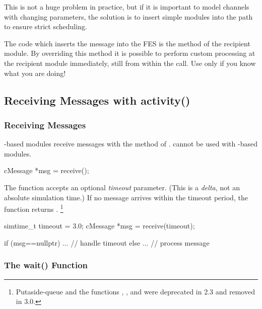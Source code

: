 \begin{ned}
\begin{note}
   This is not a huge problem in practice, but if it is important to model
   channels with changing parameters, the solution is to insert simple modules
   into the path to ensure strict scheduling.
\end{note}

The code which inserts the message into the FES is the 
method of the recipient module. By overriding this method it is possible
to perform custom processing at the recipient module immediately, still
from within the  call. Use only if you know what you are doing!


\subsection{Receiving Messages with activity()}
\label{sec:simple-modules:receiving-with-activity}

\subsubsection{Receiving Messages}
\label{sec:simple-modules:receive}

-based modules receive messages with the 
method of .  cannot be used with
-based modules.

\begin{cpp}
cMessage *msg = receive();
\end{cpp}

The  function accepts an optional \textit{timeout}
parameter. (This is a \textit{delta}, not an
absolute simulation time.) If no message arrives within the timeout
period, the function returns .
    \footnote{Putaside-queue and the functions ,
    , and  were deprecated
    in {\opp} 2.3 and removed in {\opp} 3.0.}

\begin{cpp}
simtime_t timeout = 3.0;
cMessage *msg = receive(timeout);

if (msg==nullptr) {
    ...   // handle timeout
}
else {
    ...  // process message
}
\end{cpp}

\subsubsection{The wait() Function}
\label{sec:simple-modules:wait}


\end{ned}
